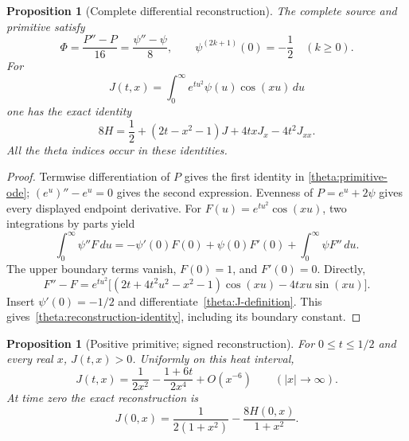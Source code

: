 \documentclass[11pt]{article}
\numberwithin{equation}{section}
\newtheorem{proposition}[theorem]{Proposition}
\theoremstyle{definition}
\theoremstyle{remark}
\begin{document}
\begin{proposition}[Complete differential reconstruction]
\label{theta:reconstruction}
The complete source and primitive satisfy
\begin{equation}
 \Phi=\frac{P''-P}{16}=\frac{\psi''-\psi}{8},
 \qquad \psi^{(2k+1)}(0)=-\frac12\quad(k\geq0).
 \label{theta:primitive-ode}
\end{equation}
For
\begin{equation}
 J(t,x)=\int_0^\infty e^{tu^2}\psi(u)\cos(xu)\,du
 \label{theta:J-definition}
\end{equation}
one has the exact identity
\begin{equation}
 \boxed{\displaystyle
 8H=\frac12+(2t-x^2-1)J+4txJ_x-4t^2J_{xx}.}
 \label{theta:reconstruction-identity}
\end{equation}
All the theta indices occur in these identities.
\end{proposition}

\begin{proof}
Termwise differentiation of $P$ gives the first identity in
\eqref{theta:primitive-ode}; $(e^u)''-e^u=0$ gives the second expression.
Evenness of $P=e^u+2\psi$ gives every displayed endpoint derivative.
For $F(u)=e^{tu^2}\cos(xu)$, two integrations by parts yield
\[
 \int_0^\infty\psi''F\,du
 =-\psi'(0)F(0)+\psi(0)F'(0)+\int_0^\infty\psi F''\,du.
\]
The upper boundary terms vanish, $F(0)=1$, and $F'(0)=0$.  Directly,
\[
 F''-F=e^{tu^2}
 \bigl[(2t+4t^2u^2-x^2-1)\cos(xu)-4txu\sin(xu)\bigr].
\]
Insert $\psi'(0)=-1/2$ and differentiate~\eqref{theta:J-definition}.
This gives~\eqref{theta:reconstruction-identity}, including its boundary
constant.
\end{proof}

\begin{proposition}[Positive primitive; signed reconstruction]
\label{theta:primitive-positive}
For $0\leq t\leq1/2$ and every real $x$, $J(t,x)>0$.  Uniformly on this
heat interval,
\begin{equation}
 J(t,x)=\frac1{2x^2}-\frac{1+6t}{2x^4}+O(x^{-6})
 \qquad(|x|\to\infty).
 \label{theta:J-asymptotic}
\end{equation}
At time zero the exact reconstruction is
\begin{equation}
 J(0,x)=\frac1{2(1+x^2)}-\frac{8H(0,x)}{1+x^2}.
 \label{theta:J-time-zero}
\end{equation}
\end{proposition}
\end{document}
